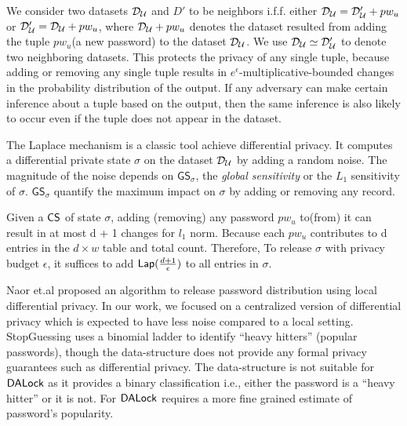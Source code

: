We consider two datasets $\mathcal{D}_{{\mathcal{U}}}$ and $D'$ to be neighbors i.f.f. either $\mathcal{D}_{{\mathcal{U}}}=\mathcal{D}_{{\mathcal{U}}}' + pw_u$ or $\mathcal{D}_{{\mathcal{U}}}'=\mathcal{D}_{{\mathcal{U}}} + pw_u$, where $\mathcal{D}_{{\mathcal{U}}} +pw_u$ denotes the dataset resulted from adding the tuple $pw_u$(a new password) to the dataset $\mathcal{D}_{{\mathcal{U}}}$. We use $\mathcal{D}_{{\mathcal{U}}}\simeq \mathcal{D}_{{\mathcal{U}}}'$ to denote two neighboring datasets. This protects the privacy of any single tuple, because adding or removing any single tuple results in $e^{\epsilon}$-multiplicative-bounded changes in the probability distribution of the output. If any adversary can make certain inference about a tuple based on the output, then the same inference is also likely to occur even if the tuple does not appear in the dataset.

The Laplace mechanism is a classic tool achieve differential privacy. It computes a differential private state $\sigma$ on the dataset $\mathcal{D}_{{\mathcal{U}}}$ by adding a random noise. The magnitude of the noise depends on $\mathsf{GS}_\sigma$, the \emph{global sensitivity} or the $L_1$ sensitivity of $\sigma$.  $\mathsf{GS}_\sigma$ quantify the maximum impact on $\sigma$ by adding or removing any record. 


 Given a $\mathsf{CS}$ of state $\sigma$, adding (removing) any password $pw_u$ to(from) it can result in at most d + 1 changes for $l_1$ norm. Because each $pw_u$ contributes to d entries in the $d \times w$ table and total count. Therefore, To release $\sigma$ with privacy budget $\epsilon$, it suffices to add $\mathsf{Lap}(\frac{d+1}{\epsilon})$ to all entries in $\sigma$. 

 Naor et.al\cite{CCS:NaoPinRon19}  proposed an algorithm to release password distribution using local differential privacy. In our work, we focused on a centralized version of differential privacy which is expected to have less noise compared to a local setting. StopGuessing\cite{EuroSP:THS19} uses a binomial ladder to identify ``heavy hitters'' (popular passwords), though the data-structure does not provide any formal privacy guarantees such as differential privacy. The data-structure is not suitable for $\mathsf{DALock}$ as it provides a binary classification i.e., either the password is a ``heavy hitter'' or it is not. For $\mathsf{DALock}$ requires a more fine grained estimate of password's popularity. 



